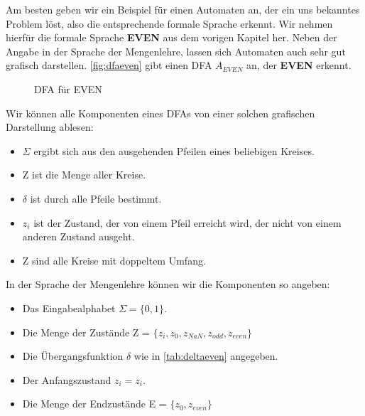 Am besten geben wir ein Beispiel für einen Automaten an,
der ein uns bekanntes Problem löst,
also die entsprechende formale Sprache erkennt.
Wir nehmen hierfür die formale Sprache \textbf{EVEN} aus dem vorigen Kapitel her.
Neben der Angabe in der Sprache der Mengenlehre,
lassen sich Automaten auch sehr gut grafisch darstellen.
\autoref{fig:dfaeven} gibt einen DFA $A_{EVEN}$ an,
der \textbf{EVEN} erkennt.

\begin{figure}[ht] %
\centering %
\caption{DFA für EVEN}
\label{fig:dfaeven}
\end{figure}

Wir können alle Komponenten eines DFAs von einer solchen grafischen Darstellung ablesen:
\begin{itemize}
    \item $\Sigma$ ergibt sich aus den ausgehenden Pfeilen eines beliebigen Kreises.
    \item Z ist die Menge aller Kreise.
    \item $\delta$ ist durch alle Pfeile bestimmt.
    \item $z_i$ ist der Zustand,
        der von einem Pfeil erreicht wird,
        der nicht von einem anderen Zustand ausgeht. 
    \item Z sind alle Kreise mit doppeltem Umfang.
\end{itemize}

In der Sprache der Mengenlehre können wir die Komponenten so angeben:
\begin{itemize}
    \item Das Eingabealphabet $\Sigma = \{0,1\}$.
    \item Die Menge der Zustände Z = $\{z_i, z_0, z_{NaN}, z_{odd}, z_{even}\}$
    \item Die Übergangsfunktion $\delta$ wie in \autoref{tab:deltaeven} angegeben.
    \item Der Anfangszustand $z_i = z_i$.
    \item Die Menge der Endzustände E = $\{z_0, z_{even}\}$ 
\end{itemize}


